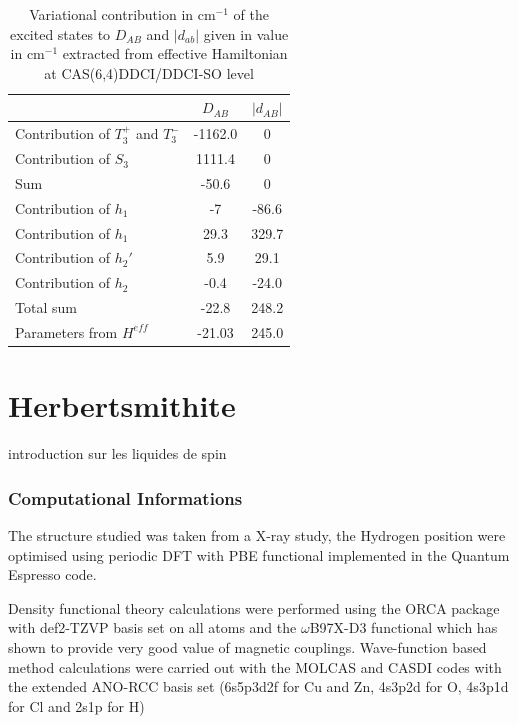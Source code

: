 \documentclass[10pt]{report}
\numberwithin{equation}{section}
\begin{document}
\begin{table}
    \centering
    \begin{tabular}{l c c}
        \hline
        \hline
         & $D_{AB}$ & $|d_{AB}|$\\
         \hline
         Contribution of $T_3^+$ and $T_3^-$& -1162.0& 0 \\
         Contribution of $S_3$& 1111.4 & 0\\
         Sum & -50.6 &0\\
         Contribution of $h_1$ & -7 & -86.6\\
         Contribution of $h_1$& 29.3 & 329.7\\
         Contribution of $h_2'$& 5.9 & 29.1\\
         Contribution of $h_2$ & -0.4 & -24.0\\
         Total sum & -22.8  & 248.2\\
         Parameters from $H^{eff}$ & -21.03 & 245.0\\
         \hline
         \hline
    \end{tabular}
    \caption{Variational contribution in cm$^{-1}$ of the excited states to $D_{AB}$ and $|d_{ab}|$ given in value in cm$^{-1}$ extracted from effective Hamiltonian at CAS(6,4)DDCI/DDCI-SO level}
    \label{tab:decompfield}
\end{table}

\chapter{Herbertsmithite}

introduction sur les liquides de spin

\subsection*{Computational Informations}

The structure studied was taken from a X-ray study, the Hydrogen position were optimised using periodic DFT with PBE functional implemented in the Quantum Espresso code.

Density functional theory calculations were performed using the ORCA package with def2-TZVP basis set on all atoms and the $\omega$B97X-D3 functional which has shown to provide very good value of magnetic couplings.
Wave-function based method calculations were carried out with the MOLCAS and CASDI codes with the extended ANO-RCC basis set (6s5p3d2f for Cu and Zn, 4s3p2d
for O, 4s3p1d for Cl and 2s1p for H)
\end{document}
